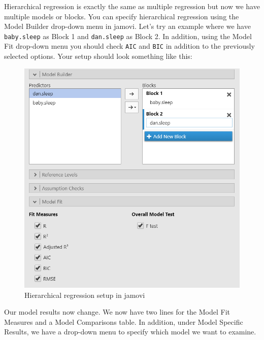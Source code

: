 \documentclass[
]{book}
\begin{document}
Hierarchical regression is exactly the same as multiple regression but now we have multiple models or blocks. You can specify hierarchical regression using the Model Builder drop-down menu in jamovi. Let's try an example where we have \texttt{baby.sleep} as Block 1 and \texttt{dan.sleep} as Block 2. In addition, using the Model Fit drop-down menu you should check \texttt{AIC} and \texttt{BIC} in addition to the previously selected options. Your setup should look something like this:

\begin{figure}

{\centering \includegraphics[width=1\linewidth]{images/13-regression/hierarchical-setup} 

}

\caption{Hierarchical regression setup in jamovi}\label{fig:unnamed-chunk-12}
\end{figure}

Our model results now change. We now have two lines for the Model Fit Measures and a Model Comparisons table. In addition, under Model Specific Results, we have a drop-down menu to specify which model we want to examine.
\end{document}
